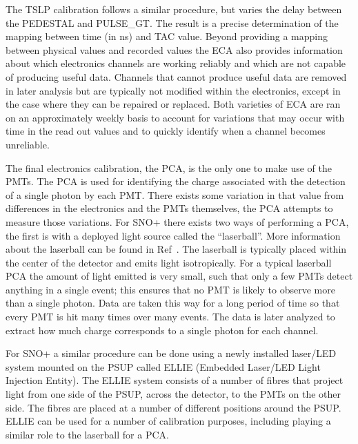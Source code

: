 The TSLP calibration follows a similar procedure, but varies the delay between
the PEDESTAL and PULSE\_GT.
The result is a precise determination of the mapping between time (in ns) and
TAC value.
Beyond providing a mapping between physical values and recorded values the ECA
also provides information about which electronics channels are working reliably
and which are not capable of producing useful data.
Channels that cannot produce useful data are removed in later analysis but are
typically not modified within the electronics, except in the case where they
can be repaired or replaced.
Both varieties of ECA are ran on an approximately weekly basis to account for
variations that may occur with time in the read out values and to quickly
identify when a channel becomes unreliable.

The final electronics calibration, the PCA, is the only one to make use of the PMTs.
The PCA is used for identifying the charge associated with the detection of a single
photon by each PMT. There exists some variation in that value from differences in the
electronics and the PMTs themselves, the PCA attempts to measure those variations.
For SNO+ there exists two ways of performing a PCA, the first is with a deployed light
source called the ``laserball''.
More information about the laserball can be found in Ref~\cite{XXX}.
The laserball is typically placed within the center of the
detector and emits light isotropically. For a typical laserball PCA the amount of light emitted
is very small, such that only a few PMTs detect anything in a single event;
this ensures that no PMT is likely to observe more than a single photon.
Data are taken this way for a long period of time so that every PMT is hit many times over
many events. The data is later analyzed to extract how much charge corresponds to a single
photon for each channel.

For SNO+ a similar procedure can be done using a newly installed laser/LED system
mounted on the PSUP called ELLIE (Embedded Laser/LED Light Injection Entity).
The ELLIE system consists of a number of fibres that project light from one
side of the PSUP, across the detector, to the PMTs on the other side.
The fibres are placed at a number of different positions around the PSUP.
ELLIE can be used for a number of calibration purposes, including playing a
similar role to the laserball for a PCA.
